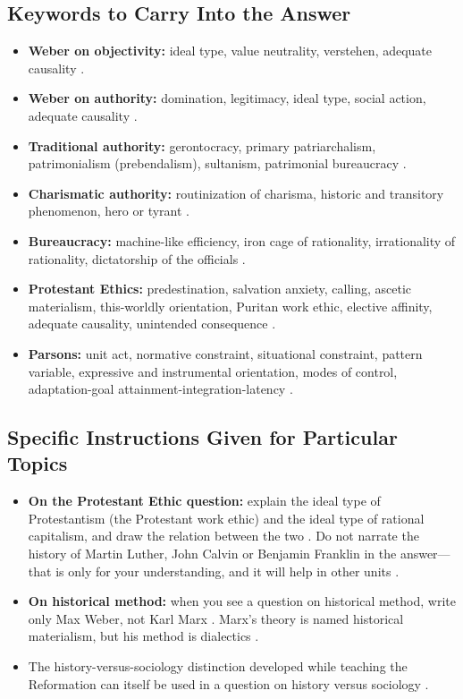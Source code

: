 \subsection{Keywords to Carry Into the Answer}
\begin{itemize}
    \item \textbf{Weber on objectivity:} ideal type, value neutrality, verstehen, adequate causality .
    \item \textbf{Weber on authority:} domination, legitimacy, ideal type, social action, adequate causality .
    \item \textbf{Traditional authority:} gerontocracy, primary patriarchalism, patrimonialism (prebendalism), sultanism, patrimonial bureaucracy .
    \item \textbf{Charismatic authority:} routinization of charisma, historic and transitory phenomenon, hero or tyrant .
    \item \textbf{Bureaucracy:} machine-like efficiency, iron cage of rationality, irrationality of rationality, dictatorship of the officials .
    \item \textbf{Protestant Ethics:} predestination, salvation anxiety, calling, ascetic materialism, this-worldly orientation, Puritan work ethic, elective affinity, adequate causality, unintended consequence .
    \item \textbf{Parsons:} unit act, normative constraint, situational constraint, pattern variable, expressive and instrumental orientation, modes of control, adaptation-goal attainment-integration-latency .
\end{itemize}

\subsection{Specific Instructions Given for Particular Topics}
\begin{itemize}
    \item \textbf{On the Protestant Ethic question:} explain the ideal type of Protestantism (the Protestant work ethic) and the ideal type of rational capitalism, and draw the relation between the two . Do not narrate the history of Martin Luther, John Calvin or Benjamin Franklin in the answer---that is only for your understanding, and it will help in other units .
    \item \textbf{On historical method:} when you see a question on historical method, write only Max Weber, not Karl Marx . Marx's theory is named historical materialism, but his method is dialectics .
    \item The history-versus-sociology distinction developed while teaching the Reformation can itself be used in a question on history versus sociology .
\end{itemize}

